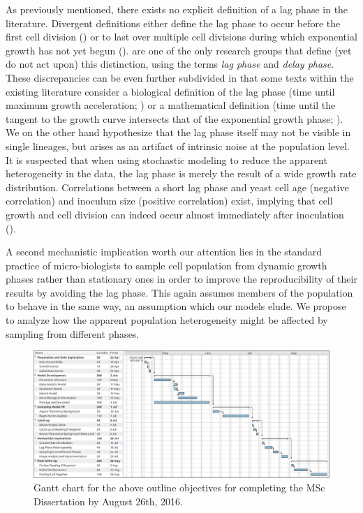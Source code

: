 \documentclass{bioinfo}
\begin{document}
As previously mentioned, there exists no explicit definition of a lag phase in the literature. Divergent definitions either define the lag phase to occur before the first cell division (\citealp{Baty04}) or to last over multiple cell divisions during which exponential growth has not yet begun (\citealp{Pin06}). \citealp{Rolfe12} are one of the only research groups that define (yet do not act upon) this distinction, using the terms \textit{lag phase} and \textit{delay phase}. These discrepancies can be even further subdivided in that some texts within the existing literature consider a biological definition of the lag phase (time until maximum growth acceleration; \citealp{Buchanan90}) or a mathematical definition (time until the tangent to the growth curve intersects that of the exponential growth phase; \citealp{Baranyi02}). We on the other hand hypothesize that the lag phase itself may not be visible in single lineages, but arises as an artifact of intrinsic noise at the population level. It is suspected that when using stochastic modeling to reduce the apparent heterogeneity in the data, the lag phase is merely the result of a wide growth rate distribution. Correlations between a short lag phase and yeast cell age (negative correlation) and inoculum size (positive correlation) exist, implying that cell growth and cell division can indeed occur almost immediately after inoculation (\citealp{Ginovart11}). 

A second mechanistic implication worth our attention lies in the standard practice of micro-biologists to sample cell population from dynamic growth phases rather than stationary ones in order to improve the reproducibility of their results by avoiding the lag phase. This again assumes members of the population to behave in the same way, an assumption which our models elude. We propose to analyze how the apparent population heterogeneity might be affected by sampling from different phases.

\begin{figure}[hb!]
\vspace{-1em}
\centering
\includegraphics[width=1\linewidth]{GanttChart.png}
\caption{Gantt chart for the above outline objectives for completing the MSc Dissertation by August 26th, 2016.}
\label{fig:GanttChart}
\vspace{-1em}
\end{figure}
\end{document}
